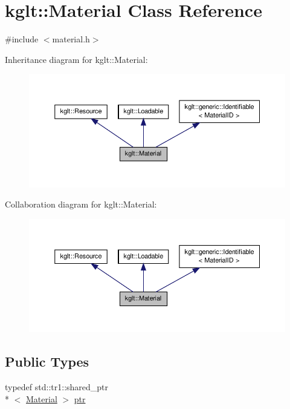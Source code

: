 \hypertarget{classkglt_1_1_material}{\section{kglt\-:\-:Material Class Reference}
\label{classkglt_1_1_material}
}


{\ttfamily \#include $<$material.\-h$>$}



Inheritance diagram for kglt\-:\-:Material\-:\nopagebreak
\begin{figure}[H]
\begin{center}
\leavevmode
\includegraphics[width=350pt]{classkglt_1_1_material__inherit__graph}
\end{center}
\end{figure}


Collaboration diagram for kglt\-:\-:Material\-:\nopagebreak
\begin{figure}[H]
\begin{center}
\leavevmode
\includegraphics[width=350pt]{classkglt_1_1_material__coll__graph}
\end{center}
\end{figure}
\subsection*{Public Types}
\begin{DoxyCompactItemize}
\item 
typedef std\-::tr1\-::shared\-\_\-ptr\\*
$<$ \hyperlink{classkglt_1_1_material}{Material} $>$ \hyperlink{classkglt_1_1_material_a5e4028035299737d4c7881ce813bff58}{ptr}
\end{DoxyCompactItemize}
